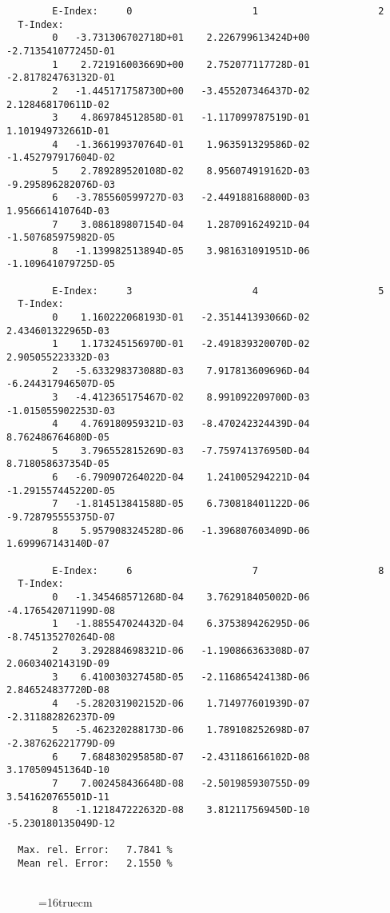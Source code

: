 \documentclass[12pt,dvipdfmx]{article}
\begin{document}
\begin{small}\begin{verbatim}
        E-Index:     0                     1                     2
  T-Index:
        0   -3.731306702718D+01    2.226799613424D+00   -2.713541077245D-01
        1    2.721916003669D+00    2.752077117728D-01   -2.817824763132D-01
        2   -1.445171758730D+00   -3.455207346437D-02    2.128468170611D-02
        3    4.869784512858D-01   -1.117099787519D-01    1.101949732661D-01
        4   -1.366199370764D-01    1.963591329586D-02   -1.452797917604D-02
        5    2.789289520108D-02    8.956074919162D-03   -9.295896282076D-03
        6   -3.785560599727D-03   -2.449188168800D-03    1.956661410764D-03
        7    3.086189807154D-04    1.287091624921D-04   -1.507685975982D-05
        8   -1.139982513894D-05    3.981631091951D-06   -1.109641079725D-05

        E-Index:     3                     4                     5
  T-Index:
        0    1.160222068193D-01   -2.351441393066D-02    2.434601322965D-03
        1    1.173245156970D-01   -2.491839320070D-02    2.905055223332D-03
        2   -5.633298373088D-03    7.917813609696D-04   -6.244317946507D-05
        3   -4.412365175467D-02    8.991092209700D-03   -1.015055902253D-03
        4    4.769180959321D-03   -8.470242324439D-04    8.762486764680D-05
        5    3.796552815269D-03   -7.759741376950D-04    8.718058637354D-05
        6   -6.790907264022D-04    1.241005294221D-04   -1.291557445220D-05
        7   -1.814513841588D-05    6.730818401122D-06   -9.728795555375D-07
        8    5.957908324528D-06   -1.396807603409D-06    1.699967143140D-07

        E-Index:     6                     7                     8
  T-Index:
        0   -1.345468571268D-04    3.762918405002D-06   -4.176542071199D-08
        1   -1.885547024432D-04    6.375389426295D-06   -8.745135270264D-08
        2    3.292884698321D-06   -1.190866363308D-07    2.060340214319D-09
        3    6.410030327458D-05   -2.116865424138D-06    2.846524837720D-08
        4   -5.282031902152D-06    1.714977601939D-07   -2.311882826237D-09
        5   -5.462320288173D-06    1.789108252698D-07   -2.387626221779D-09
        6    7.684830295858D-07   -2.431186166102D-08    3.170509451364D-10
        7    7.002458436648D-08   -2.501985930755D-09    3.541620765501D-11
        8   -1.121847222632D-08    3.812117569450D-10   -5.230180135049D-12

  Max. rel. Error:   7.7841 %
  Mean rel. Error:   2.1550 %


\end{verbatim}\end{small}
\begin{figure} \label{2.2.15e}
\epsfxsize=16truecm
\end{figure}
\newpage
\end{document}
